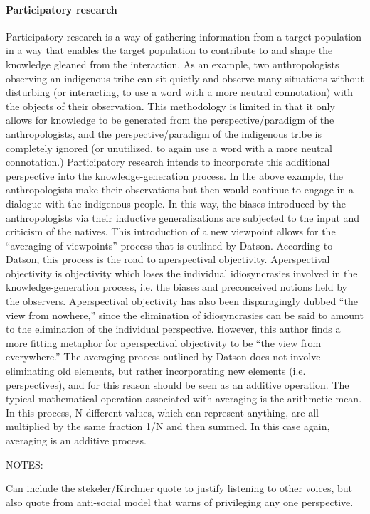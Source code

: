 \documentclass{lps}
\begin{document}
\paragraph{Participatory research}
Participatory research is a way of gathering information from a target population in a way that enables the target population to contribute to and shape the knowledge gleaned from the interaction. As an example, two anthropologists observing an indigenous tribe can sit quietly and observe many situations without disturbing (or interacting, to use a word with a more neutral connotation) with the objects of their observation. This methodology is limited in that it only allows for knowledge to be generated from the perspective/paradigm of the anthropologists, and the perspective/paradigm of the indigenous tribe is completely ignored (or unutilized, to again use a word with a more neutral connotation.)
    Participatory research intends to incorporate this additional perspective into the knowledge-generation process. In the above example, the anthropologists make their observations but then would continue to engage in a dialogue with the indigenous people. In this way, the biases introduced by the anthropologists via their inductive generalizations are subjected to the input and criticism of the natives. This introduction of a new viewpoint allows for the “averaging of viewpoints” process that is outlined by Datson. According to Datson, this process is the road to aperspectival objectivity. Aperspectival objectivity is objectivity which loses the individual idiosyncrasies involved in the knowledge-generation process, i.e. the biases and preconceived notions held by the observers. Aperspectival objectivity has also been disparagingly dubbed “the view from nowhere,” since the elimination of idiosyncrasies can be said to amount to the elimination of the individual perspective. However, this author finds a more fitting metaphor for aperspectival objectivity to be “the view from everywhere.” The averaging process outlined by Datson does not involve eliminating old elements, but rather incorporating new elements (i.e. perspectives), and for this reason should be seen as an additive operation. The typical mathematical operation associated with averaging is the arithmetic mean. In this process, N different values, which can represent anything, are all multiplied by the same fraction 1/N and then summed. In this case again, averaging is an additive process.


NOTES:

Can include the stekeler/Kirchner quote to justify listening to other voices, but also quote from anti-social model that warns of privileging any one perspective.
\end{document}
